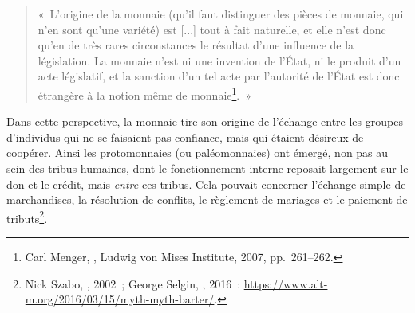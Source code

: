 \begin{quote}
«~L'origine de la monnaie (qu'il faut distinguer des pièces de monnaie, qui n'en sont qu'une variété) est [...] tout à fait naturelle, et elle n'est donc qu'en de très rares circonstances le résultat d'une influence de la législation. La monnaie n'est ni une invention de l'État, ni le produit d'un acte législatif, et la sanction d'un tel acte par l'autorité de l'État est donc étrangère à la notion même de monnaie\footnote{Carl Menger, , Ludwig von Mises Institute, 2007, pp.~261--262.}.~»
\end{quote} %

\clearpage
Dans cette perspective, la monnaie tire son origine de l'échange entre les groupes d'individus qui ne se faisaient pas confiance, mais qui étaient désireux de coopérer. Ainsi les protomonnaies (ou paléomonnaies) ont émergé, non pas au sein des tribus humaines, dont le fonctionnement interne reposait largement sur le don et le crédit, mais \emph{entre} ces tribus. Cela pouvait concerner l'échange simple de marchandises, la résolution de conflits, le règlement de mariages et le paiement de tributs\footnote{Nick Szabo, , 2002~; George Selgin, , 2016~: \url{https://www.alt-m.org/2016/03/15/myth-myth-barter/}.}. %


